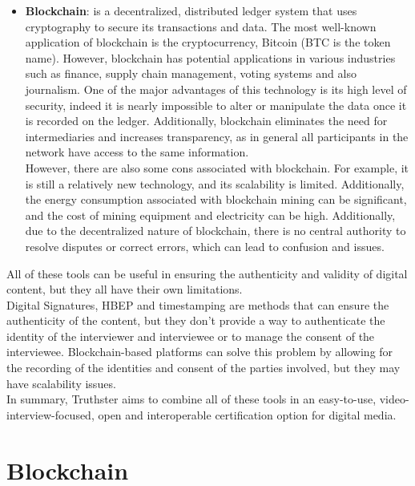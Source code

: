 \documentclass[target=mst,aauheader=]{thud}
\begin{document}
\begin{itemize}
    \item \textbf{Blockchain}: is a decentralized, distributed ledger system that uses cryptography to secure its transactions and data. The most well-known application of blockchain is the cryptocurrency, Bitcoin (BTC is the token name). However, blockchain has potential applications in various industries such as finance, supply chain management, voting systems and also journalism. One of the major advantages of this technology is its high level of security, indeed it is nearly impossible to alter or manipulate the data once it is recorded on the ledger. Additionally, blockchain eliminates the need for intermediaries and increases transparency, as in general all participants in the network have access to the same information.\\However, there are also some cons associated with blockchain. For example, it is still a relatively new technology, and its scalability is limited. Additionally, the energy consumption associated with blockchain mining can be significant, and the cost of mining equipment and electricity can be high. Additionally, due to the decentralized nature of blockchain, there is no central authority to resolve disputes or correct errors, which can lead to confusion and issues.

\end{itemize}

All of these tools can be useful in ensuring the authenticity and validity of digital content, but they all have their own limitations.\\
Digital Signatures, HBEP and timestamping are methods that can ensure the authenticity of the content, but they don't provide a way to authenticate the identity of the interviewer and interviewee or to manage the consent of the interviewee. Blockchain-based platforms can solve this problem by allowing for the recording of the identities and consent of the parties involved, but they may have scalability issues.\\

In summary, Truthster aims to combine all of these tools in an easy-to-use, video-interview-focused, open and interoperable certification option for digital media.


\chapter{Blockchain}
\label{chapter:blockchain}
\end{document}
